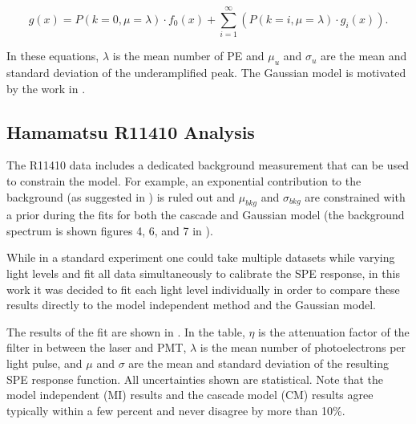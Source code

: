 \begin{equation}
        \label{eqn:gaussian_pdf}
        g(x) = P(k=0, \mu=\lambda) \cdot f_0(x) + \sum^{\infty}_{i=1} (P(k=i, \mu=\lambda) \cdot g_i(x)).
\end{equation}

In these equations, $\lambda$ is the mean number of PE and $\mu_u$ and $\sigma_u$ are the mean and standard deviation of the underamplified peak.  The Gaussian model is motivated by the work in .  



\subsection{Hamamatsu R11410 Analysis}

The R11410 data includes a dedicated background measurement that can be used to constrain the model.  For example, an exponential contribution to the background (as suggested in ) is ruled out and $\mu_{bkg}$ and $\sigma_{bkg}$ are constrained with a prior during the fits for both the cascade and Gaussian model (the background spectrum is shown figures 4, 6, and 7 in ).

While in a standard experiment one could take multiple datasets while varying light levels and fit all data simultaneously to calibrate the SPE response, in this work it was decided to fit each light level individually in order to compare these results directly to the model independent method and the Gaussian model.  

The results of the fit are shown in .  In the table, $\eta$ is the attenuation factor of the filter in between the laser and PMT, $\lambda$ is the mean number of photoelectrons per light pulse, and $\mu$ and $\sigma$ are the mean and standard deviation of the resulting SPE response function.  All uncertainties shown are statistical.  Note that the model independent (MI) results and the cascade model (CM) results agree typically within a few percent and never disagree by more than 10\%.



